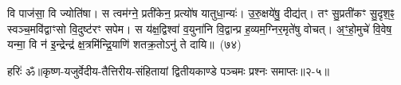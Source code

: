वि पाज॑सा॒ वि ज्योति॑षा। स त्वम॑ग्ने॒ प्रती॑केन॒ प्रत्यो॑ष यातुधा॒न्यः॑। उ॒रु॒क्षये॑षु॒ दीद्य॑त्। तꣳ सु॒प्रती॑कꣳ सु॒दृश॒ꣴ॒ स्वञ्च॒मवि॑द्वाꣳसो वि॒दुष्ट॑रꣳ सपेम। स य॑क्ष॒द्विश्वा॑ व॒युना॑नि वि॒द्वान्प्र ह॒व्यम॒ग्निर॒मृते॑षु वोचत्। अ॒ꣳ॒हो॒मुचे॑ वि॒वेष॒ यन्मा॒ वि न॑ इ॒न्द्रेन्द्र॑ क्ष॒त्रमि॑न्द्रि॒याणि॑ शतक्र॒तो\-ऽनु॑ ते दायि॥~(७४)\ip

{\anuvakamend[{य॒ह्वीः सम॑ध्व॒राय॑ नो॒ वरु॑णꣳ राज॒ꣴ॒ श्चतु॑श्चत्वारिꣳशच्च}]}%

{हरिः॑ ॐ}{॥कृष्ण-यजुर्वेदीय-तैत्तिरीय-संहितायां द्वितीयकाण्डे पञ्चमः प्रश्नः समाप्तः॥२-५॥}


